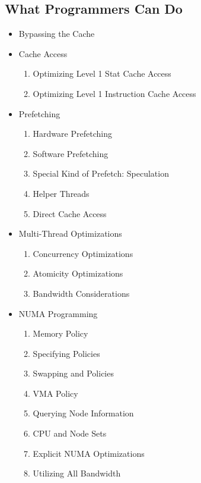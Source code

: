 \documentclass[a4paper]{article}
\begin{document}

\subsection{What Programmers Can Do}
\begin{itemize}
   \item Bypassing the Cache
   \item Cache Access
      \begin{enumerate}
	 \item Optimizing Level 1 Stat Cache Access 
	 \item Optimizing Level 1 Instruction Cache Access
      \end{enumerate}
   \item Prefetching
      \begin{enumerate}
	 \item Hardware Prefetching
	 \item Software Prefetching
	 \item Special Kind of Prefetch: Speculation
	 \item Helper Threads
	 \item Direct Cache Access
      \end{enumerate}
   \item Multi-Thread Optimizations
      \begin{enumerate}
	 \item Concurrency Optimizations
	 \item Atomicity Optimizations
	 \item Bandwidth Considerations
      \end{enumerate}
   \item NUMA Programming
      \begin{enumerate}
	 \item Memory Policy
	 \item Specifying Policies
	 \item Swapping and Policies
	 \item VMA Policy
	 \item Querying Node Information
	 \item CPU and Node Sets
	 \item Explicit NUMA Optimizations
	 \item Utilizing All Bandwidth
      \end{enumerate}
\end{itemize}
\end{document}
